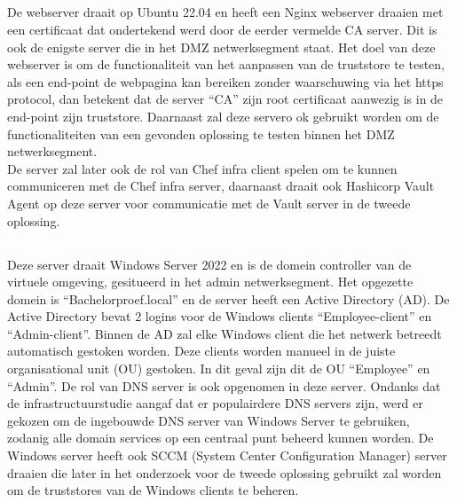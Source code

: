 \subsection{}
\label{subsec:Webserver}

De webserver draait op Ubuntu 22.04 en heeft een Nginx webserver draaien met een certificaat dat ondertekend werd door de eerder vermelde CA server. Dit is ook de enigste server die in het DMZ netwerksegment staat.
Het doel van deze webserver is om de functionaliteit van het aanpassen van de truststore te testen, als een end-point de webpagina kan bereiken zonder waarschuwing via het https protocol, dan betekent dat de server ``CA'' zijn root certificaat aanwezig is in de end-point zijn truststore.
Daarnaast zal deze servero ok gebruikt worden om de functionaliteiten van een gevonden oplossing te testen binnen het DMZ netwerksegment. \\
De server zal later ook de rol van Chef infra client spelen om te kunnen communiceren met de Chef infra server, daarnaast draait ook Hashicorp Vault Agent op deze server voor communicatie met de Vault server in de tweede oplossing.

\subsection{}
\label{subsec:Windows_server}

Deze server draait Windows Server 2022 en is de domein controller van de virtuele omgeving, gesitueerd in het admin netwerksegment. Het opgezette domein is ``Bachelorproef.local'' en de server heeft een Active Directory (AD). De Active Directory bevat 2 logins voor de Windows clients ``Employee-client'' en ``Admin-client''. Binnen de AD zal elke Windows client die het netwerk betreedt automatisch gestoken worden. 
Deze clients worden manueel in de juiste organisational unit (OU) gestoken. In dit geval zijn dit de OU ``Employee'' en ``Admin''.
De rol van DNS server is ook opgenomen in deze server. Ondanks dat de infrastructuurstudie aangaf dat er populairdere DNS servers zijn, werd er gekozen om de ingebouwde DNS server van Windows Server te gebruiken, zodanig alle domain services op een centraal punt beheerd kunnen worden.
De Windows server heeft ook SCCM (System Center Configuration Manager) server draaien die later in het onderzoek voor de tweede oplossing gebruikt zal worden om de truststores van de Windows clients te beheren.

